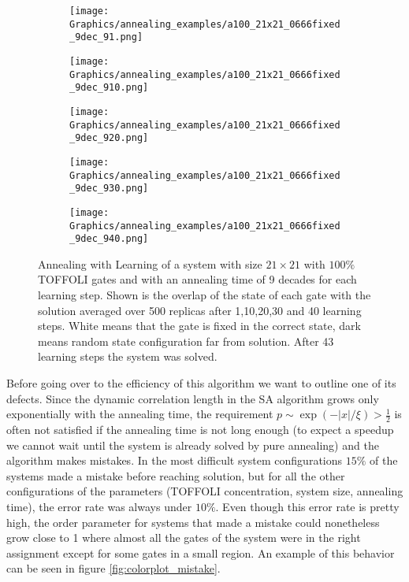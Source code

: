 \begin{figure}[hbtp]
  \centering
  \begin{subfigure}{0.18\textwidth}
    \texttt{[image: Graphics/annealing\_examples/a100\_21x21\_0666fixed\_9dec\_91.png]}
  \end{subfigure}
  \begin{subfigure}{0.18\textwidth}
    \texttt{[image: Graphics/annealing\_examples/a100\_21x21\_0666fixed\_9dec\_910.png]}
  \end{subfigure}
  \begin{subfigure}{0.18\textwidth}
    \texttt{[image: Graphics/annealing\_examples/a100\_21x21\_0666fixed\_9dec\_920.png]}
  \end{subfigure}
  \begin{subfigure}{0.18\textwidth}
    \texttt{[image: Graphics/annealing\_examples/a100\_21x21\_0666fixed\_9dec\_930.png]}
  \end{subfigure}
  \begin{subfigure}{0.18\textwidth}
    \texttt{[image: Graphics/annealing\_examples/a100\_21x21\_0666fixed\_9dec\_940.png]}
  \end{subfigure}

  \caption{Annealing with Learning of a system with size $21\times 21$ with $100\%$ TOFFOLI gates and with an annealing time of 9 decades for each learning step. Shown is the overlap of the state of each gate with the solution averaged over 500 replicas after 1,10,20,30 and 40 learning steps. White means that the gate is fixed in the correct state, dark means random state configuration far from solution. After 43 learning steps the system was solved.}
  \label{fig:colorplot_example}
\end{figure}

Before going over to the efficiency of this algorithm we want to outline one of its defects.
Since the dynamic correlation length in the SA algorithm grows only exponentially with the annealing time, the requirement $p\sim \exp(-\lvert x \rvert / \xi)>\frac{1}{2}$ is often not satisfied if the annealing time is not long enough (to expect a speedup we cannot wait until the system is already solved by pure annealing) and the algorithm makes mistakes.
In the most difficult system configurations $15\%$ of the systems made a mistake before reaching solution, but for all the other configurations of the parameters (TOFFOLI concentration, system size, annealing time), the error rate was always under $10\%$.
Even though this error rate is pretty high, the order parameter for systems that made a mistake could nonetheless grow close to 1 where almost all the gates of the system were in the right assignment except for some gates in a small region.
An example of this behavior can be seen in figure \ref{fig:colorplot_mistake}.


